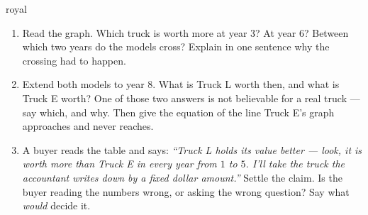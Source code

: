 \documentclass[10pt]{article}
\begin{document}
\begin{scenariobox}{royal}
\begin{enumerate}[leftmargin=1.6em, itemsep=6pt, topsep=2pt, start=6]

\item Read the graph. Which truck is worth more at year $3$? At year $6$? Between which two years do
the models cross? Explain in one sentence why the crossing had to happen.


\item Extend both models to year $8$. What is Truck L worth then, and what is Truck E worth? One of
those two answers is not believable for a real truck --- say which, and why. Then give the equation
of the line Truck E's graph approaches and never reaches.


\item A buyer reads the table and says: \emph{``Truck L holds its value better --- look, it is worth
more than Truck E in every year from $1$ to $5$. I'll take the truck the accountant writes down by a
fixed dollar amount.''} Settle the claim. Is the buyer reading the numbers wrong, or asking the wrong
question? Say what \emph{would} decide it.


\end{enumerate}
\end{scenariobox}

\vspace{0.10in}
\end{document}
